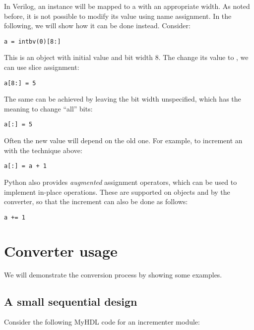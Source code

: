 In Verilog, an  instance will be mapped to a 
with an appropriate width. As noted before, it is not possible
to modify its value using name assignment. In the following, we
will show how it can be done instead. Consider:

\begin{verbatim}
a = intbv(0)[8:]
\end{verbatim}

This is an  object with initial value  and
bit width 8. The change its value to , we can use
slice assignment:

\begin{verbatim}
a[8:] = 5
\end{verbatim}

The same can be achieved by leaving the bit width unspecified, 
which has the meaning to change ``all'' bits:

\begin{verbatim}
a[:] = 5
\end{verbatim}

Often the new value will depend on the old one. For example,
to increment an  with the technique above:

\begin{verbatim}
a[:] = a + 1
\end{verbatim}

Python also provides \emph{augmented} assignment operators,
which can be used to implement in-place operations. These are supported
on  objects and by the converter, so that the increment
can also be done as follows:

\begin{verbatim}
a += 1
\end{verbatim}

\section{Converter usage\label{conv-usage}}

We will demonstrate the conversion process by showing some examples.

\subsection{A small sequential design\label{conv-usage-seq}}

Consider the following MyHDL code for an incrementer module:

